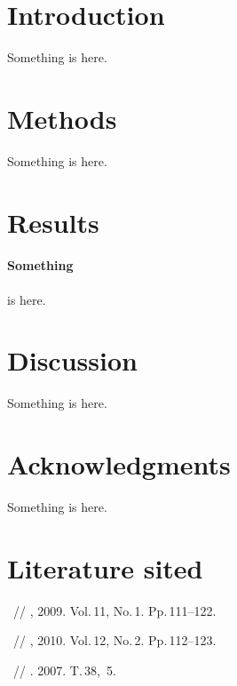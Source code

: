 \documentclass[12pt,twoside]{article}
\begin{document}
\English
\maketitle
\linenumbers

\section{Introduction}
Something is here.
\section{Methods}
Something is here.
\section{Results}
\paragraph{Something} is here. 
\section{Discussion}
Something is here.
\section{Acknowledgments}
Something is here.
\section{Literature sited}
~//
, 2009. Vol.\,11, No.\,1.
Pp.\,111--122.

~//
, 2010. Vol.\,12, No.\,2.
Pp.\,112--123.

~//
. 2007. T.\,38, \No\,5.
\end{document}
